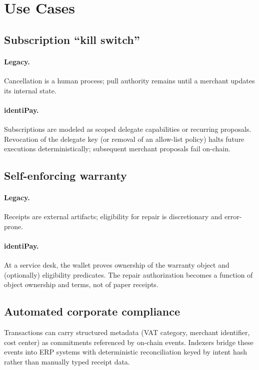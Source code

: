 \documentclass[11pt]{article}
\begin{document}
\section{Use Cases}
\subsection{Subscription ``kill switch''}
\paragraph{Legacy.}
Cancellation is a human process; pull authority remains until a merchant updates its internal state.

\paragraph{identiPay.}
Subscriptions are modeled as scoped delegate capabilities or recurring proposals. Revocation of the delegate key (or removal of an allow-list policy) halts future executions deterministically; subsequent merchant proposals fail on-chain.

\subsection{Self-enforcing warranty}
\paragraph{Legacy.}
Receipts are external artifacts; eligibility for repair is discretionary and error-prone.

\paragraph{identiPay.}
At a service desk, the wallet proves ownership of the warranty object and (optionally) eligibility predicates. The repair authorization becomes a function of object ownership and terms, not of paper receipts.

\subsection{Automated corporate compliance}
Transactions can carry structured metadata (VAT category, merchant identifier, cost center) as commitments referenced by on-chain events. Indexers bridge these events into ERP systems with deterministic reconciliation keyed by intent hash rather than manually typed receipt data.
\end{document}
